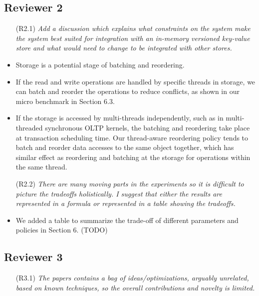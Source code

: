 \documentclass{article}
\newcommand{\changed}[1]{#1}
\newcommand{\changed}[1]{{\color{blue}#1}}
\begin{document}
\subsection{Reviewer 2}

\begin{itemize}
\item[(R2.1)] \emph{Add a discussion which explains what constraints on the system make the system best suited for integration with an in-memory versioned key-value store and what would need to change to be integrated with other stores.}
\end{itemize}

\changed{
	\begin{itemize}
		\item Storage is a potential stage of batching and reordering.
		\item If the read and write operations are handled by specific threads in storage, we can batch and reorder the operations to reduce conflicts, as shown in our micro benchmark in Section 6.3.
		\item If the storage is accessed by multi-threads independently, such as in multi-threaded synchronous OLTP kernels, the batching and reordering take place at transaction scheduling time. Our thread-aware reordering policy tends to batch and reorder data accesses to the same object together, which has similar effect as reordering and batching at the storage for operations within the same thread.
	\end{itemize}
}

\begin{itemize}
\item[(R2.2)] \emph{There are many moving parts in the experiments so it is difficult to picture the tradeoffs holistically. I suggest that either the results are represented in a formula or represented in a table showing the tradeoffs.}
\end{itemize}

\changed{
	\begin{itemize}
		\item We added a table to summarize the trade-off of different parameters and policies in Section 6. (TODO)
	\end{itemize}
}

\subsection{Reviewer 3}

\begin{itemize}
\item[(R3.1)] \emph{The papers contains a bag of ideas/optimizations, arguably unrelated,
	based on known techniques, so the overall contributions and novelty is
	limited.}
\end{itemize}
\end{document}
